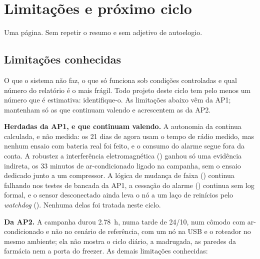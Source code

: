 \chapter{Limitações e próximo ciclo}
\label{cap:conclusao}
\rubricaComunicacao

\begin{orientacao}
Uma página. Sem repetir o resumo e sem adjetivo de autoelogio.
\end{orientacao}

\section{Limitações conhecidas}

\begin{orientacao}
O que o sistema não faz, o que só funciona sob condições controladas e
qual número do relatório é o mais frágil. Todo projeto deste ciclo tem
pelo menos um número que é estimativa: identifique-o. As limitações
abaixo vêm da AP1; mantenham só as que continuam valendo e acrescentem
as da AP2.
\end{orientacao}

\textbf{Herdadas da AP1, e que continuam valendo.} A autonomia da
 continua calculada, e não medida: os 21 dias de agora usam o
tempo de rádio medido, mas nenhum ensaio com bateria real foi feito, e o
consumo do alarme segue fora da conta. A robustez a interferência
eletromagnética () ganhou só uma evidência indireta, os 33
minutos de ar-condicionado ligado na campanha, sem o ensaio dedicado
junto a um compressor. A lógica de mudança de faixa () continua
falhando nos testes de bancada da AP1, a cessação do alarme ()
continua sem log formal, e o sensor desconectado ainda leva o nó a um
laço de reinícios pelo \emph{watchdog} (). Nenhuma delas foi
tratada neste ciclo.

\textbf{Da AP2.} A campanha durou \SI{2,78}{\hour}, numa tarde de
24/10, num cômodo com ar-condicionado e não no cenário de referência, com
um nó na USB e o roteador no mesmo ambiente; ela não mostra o ciclo
diário, a madrugada, as paredes da farmácia nem a porta do freezer. As
demais limitações conhecidas:


